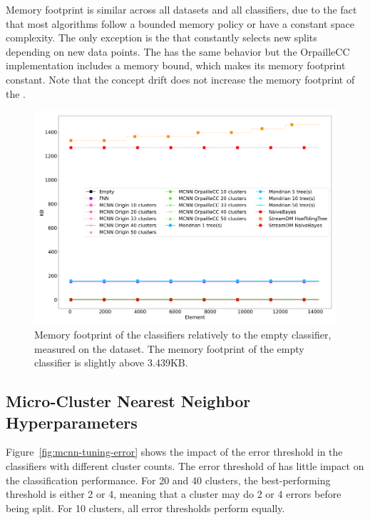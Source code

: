 Memory footprint is similar across all datasets and all classifiers, due to the
fact that most algorithms follow a bounded memory policy or have a constant
space complexity.  The only exception is the \hoeffdingtree that constantly
selects new splits depending on new data points. The \mondrianforest has the
same behavior but the OrpailleCC implementation includes a memory bound, which
makes its memory footprint constant. Note that the concept drift does not
increase the memory footprint of the \hoeffdingtree.



\begin{figure}
	\includegraphics[width=\linewidth]{figures/results/banos_3_memory.png}
	\caption{Memory footprint of the classifiers relatively to the empty
	classifier, measured on the \banosdataset dataset. The memory footprint of the empty
	classifier is slightly above 3.439KB.}
	\label{fig:memory}
\end{figure}


\subsection{Micro-Cluster Nearest Neighbor Hyperparameters}

Figure~\ref{fig:mcnn-tuning-error} shows the impact of the error threshold
in the \mcnn classifiers with different cluster counts. The error
threshold of \mcnn has little impact on the classification performance. For
20 and 40 clusters, the best-performing threshold is either 2 or 4, meaning
that a cluster may do 2 or 4 errors before being split. For 10 clusters,
all error thresholds perform equally.

